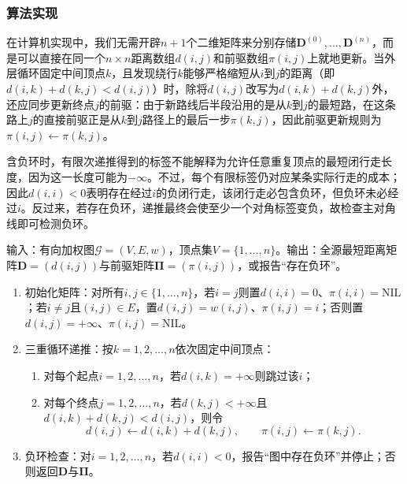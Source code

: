 \subsubsection{算法实现}

在计算机实现中，我们无需开辟$n+1$个二维矩阵来分别存储$\bm D^{(0)},\ldots,\bm D^{(n)}$，而是可以直接在同一个$n\times n$距离数组$d(i,j)$和前驱数组$\pi(i,j)$上就地更新。当外层循环固定中间顶点$k$，且发现绕行$k$能够严格缩短从$i$到$j$的距离（即$d(i,k)+d(k,j)<d(i,j)$）时，除将$d(i,j)$改写为$d(i,k)+d(k,j)$外，还应同步更新终点$j$的前驱：由于新路线后半段沿用的是从$k$到$j$的最短路，在这条路上$j$的直接前驱正是从$k$到$j$路径上的最后一步$\pi(k,j)$，因此前驱更新规则为$\pi(i,j)\gets\pi(k,j)$。

含负环时，有限次递推得到的标签不能解释为允许任意重复顶点的最短闭行走长度，因为这一长度可能为$-\infty$。不过，每个有限标签仍对应某条实际行走的成本；因此$d(i,i)<0$表明存在经过$i$的负闭行走，该闭行走必包含负环，但负环未必经过$i$。反过来，若存在负环，递推最终会使至少一个对角标签变负，故检查主对角线即可检测负环。

\begin{algorithm}
\label{alg:floyd-warshall}
输入：有向加权图$\mathcal G=(V,E,w)$，顶点集$V=\{1,\ldots,n\}$。输出：全源最短距离矩阵$\bm D=(d(i,j))$与前驱矩阵$\bm\Pi=(\pi(i,j))$，或报告“存在负环”。
\begin{enumerate}
  \item 初始化矩阵：对所有$i,j\in\{1,\ldots,n\}$，若$i=j$则置$d(i,i)=0$、$\pi(i,i)=\mathrm{NIL}$；若$i\neq j$且$(i,j)\in E$，置$d(i,j)=w(i,j)$、$\pi(i,j)=i$；否则置$d(i,j)=+\infty$、$\pi(i,j)=\mathrm{NIL}$。
  \item 三重循环递推：按$k=1,2,\ldots,n$依次固定中间顶点：
    \begin{enumerate}
      \item 对每个起点$i=1,2,\ldots,n$，若$d(i,k)=+\infty$则跳过该$i$；
      \item 对每个终点$j=1,2,\ldots,n$，若$d(k,j)<+\infty$且$d(i,k)+d(k,j)<d(i,j)$，则令
      \[
        d(i,j)\gets d(i,k)+d(k,j),\qquad \pi(i,j)\gets \pi(k,j).
      \]
    \end{enumerate}
  \item 负环检查：对$i=1,2,\ldots,n$，若$d(i,i)<0$，报告“图中存在负环”并停止；否则返回$\bm D$与$\bm\Pi$。
\end{enumerate}
\end{algorithm}

